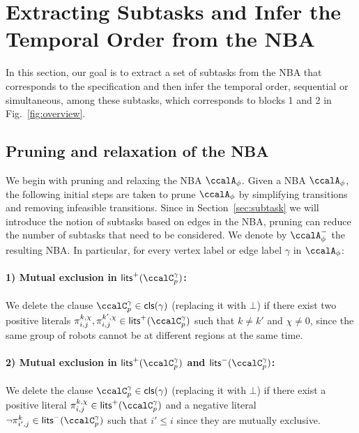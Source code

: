 \documentclass[Afour,sageh,times]{sagej}
\newcounter{mycounter}
\newenvironment{noindlist}
 {\begin{list}{\alph{mycounter})~~}{\usecounter{mycounter} \labelsep=0em \labelwidth=0em \leftmargin=0em \itemindent=0em}}
 {\end{list}}
\newcommand{\cp}[2]{\ccalC_{#1}^{#2}}
\newcommand{\autop}{\ccalA_{\phi}}
\renewcommand{\ap}[3]{\mathcal{\pi}_{{#1},{#2}}^{#3}}
\begin{document}
{   


\section{Extracting Subtasks and Infer the Temporal Order from the NBA}\label{sec:app}
     In this section, our goal is to extract a set of subtasks from the NBA that corresponds to the specification and then infer the temporal order, sequential or simultaneous, among these subtasks, which corresponds to blocks 1 and 2 in Fig.~\ref{fig:overview}.
\subsection{{Pruning and relaxation of the NBA}}\label{sec:prune}

We begin with pruning and relaxing the NBA $\autop$. Given a NBA $\autop$, the following initial steps are taken to prune $\autop$ by simplifying transitions and removing infeasible transitions. Since in Section~\ref{sec:subtask} we will introduce the notion of subtasks based on edges in the NBA, pruning can reduce the number of subtasks that need to be considered.
We denote by $\autop^-$ the resulting NBA. In particular, for every vertex label or edge label $\gamma$ in $\autop$:
\paragraph{1) Mutual exclusion in $\mathsf{lits}^+(\cp{p}{\gamma})$:}\label{prune:exclusion1} We delete the clause $\cp{p}{\gamma} \in \mathsf{cls}(\gamma)$ (replacing it with $\bot$) if there exist two positive literals $\ap{i}{j}{k,\chi}, \ap{i}{j}{k',\chi} \in \mathsf{lits}^+(\cp{p}{\gamma})$ such that $k\not= k'$ and $\chi\not=0$, since the same group of robots cannot be at different regions at the same time.
 \paragraph{2) Mutual exclusion in $\mathsf{lits}^+(\cp{p}{\gamma})$  and $\mathsf{lits}^-(\cp{p}{\gamma})$:} \label{prune:exclusion2} We delete the clause $\cp{p}{\gamma} \in \mathsf{cls}(\gamma)$ (replacing it with $\bot$) if there exist a positive literal $\ap{i}{j}{k,\chi} \in \mathsf{lits}^+(\cp{p}{\gamma})$ and a negative literal $\neg \ap{i'}{j}{k} \in \mathsf{lits}^-(\cp{p}{\gamma})$ such that $i' \leq i$ since they are mutually  exclusive.
}
\end{document}
